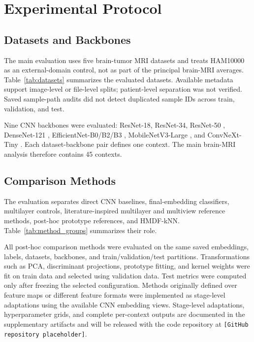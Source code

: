 \documentclass[main.tex]{subfiles}
\begin{document}
\section{Experimental Protocol}
\label{sec:protocol}

\subsection{Datasets and Backbones}

The main evaluation uses five brain-tumor MRI datasets and treats HAM10000 as an external-domain control, not as part of the principal brain-MRI averages. Table~\ref{tab:datasets} summarizes the evaluated datasets. Available metadata support image-level or file-level splits; patient-level separation was not verified. Saved sample-path audits did not detect duplicated sample IDs across train, validation, and test.



Nine CNN backbones were evaluated: ResNet-18, ResNet-34, ResNet-50 \cite{he2016resnet}, DenseNet-121 \cite{huang2017densenet}, EfficientNet-B0/B2/B3 \cite{tan2019efficientnet}, MobileNetV3-Large \cite{howard2019mobilenetv3}, and ConvNeXt-Tiny \cite{liu2022convnext}. Each dataset-backbone pair defines one context. The main brain-MRI analysis therefore contains 45 contexts.

\subsection{Comparison Methods}

The evaluation separates direct CNN baselines, final-embedding classifiers, multilayer controls, literature-inspired multilayer and multiview reference methods, post-hoc prototype references, and HMDF-kNN. Table~\ref{tab:method_groups} summarizes their role.



All post-hoc comparison methods were evaluated on the same saved embeddings, labels, datasets, backbones, and train/validation/test partitions. Transformations such as PCA, discriminant projections, prototype fitting, and kernel weights were fit on train data and selected using validation data. Test metrics were computed only after freezing the selected configuration. Methods originally defined over feature maps or different feature formats were implemented as stage-level adaptations using the available CNN embedding views. Stage-level adaptations, hyperparameter grids, and complete per-context outputs are documented in the supplementary artifacts and will be released with the code repository at \texttt{[GitHub repository placeholder]}.
\end{document}
